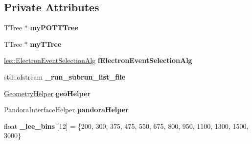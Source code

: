 \subsection*{Private Attributes}
\begin{DoxyCompactItemize}
\item 
\hypertarget{classlee_1_1ElectronNeutrinoFilter_a71f4be7e318ce49ff07a948e17afe40d}{T\-Tree $\ast$ {\bfseries my\-P\-O\-T\-T\-Tree}}\label{classlee_1_1ElectronNeutrinoFilter_a71f4be7e318ce49ff07a948e17afe40d}

\item 
\hypertarget{classlee_1_1ElectronNeutrinoFilter_a0cd8d0a8b3466ad728bd8b520c2fd392}{T\-Tree $\ast$ {\bfseries my\-T\-Tree}}\label{classlee_1_1ElectronNeutrinoFilter_a0cd8d0a8b3466ad728bd8b520c2fd392}

\item 
\hypertarget{classlee_1_1ElectronNeutrinoFilter_a218cb05b2710a8cfaa9021cc7850bb28}{\hyperlink{classlee_1_1ElectronEventSelectionAlg}{lee\-::\-Electron\-Event\-Selection\-Alg} {\bfseries f\-Electron\-Event\-Selection\-Alg}}\label{classlee_1_1ElectronNeutrinoFilter_a218cb05b2710a8cfaa9021cc7850bb28}

\item 
\hypertarget{classlee_1_1ElectronNeutrinoFilter_ac9531a2782934676b4a5c5562da3139c}{std\-::ofstream {\bfseries \-\_\-run\-\_\-subrun\-\_\-list\-\_\-file}}\label{classlee_1_1ElectronNeutrinoFilter_ac9531a2782934676b4a5c5562da3139c}

\item 
\hypertarget{classlee_1_1ElectronNeutrinoFilter_ae709489ed7e674f1e54d7e756058bacf}{\hyperlink{classlee_1_1GeometryHelper}{Geometry\-Helper} {\bfseries geo\-Helper}}\label{classlee_1_1ElectronNeutrinoFilter_ae709489ed7e674f1e54d7e756058bacf}

\item 
\hypertarget{classlee_1_1ElectronNeutrinoFilter_affbf7de91f50382bd10ac94512a6bb54}{\hyperlink{classlee_1_1PandoraInterfaceHelper}{Pandora\-Interface\-Helper} {\bfseries pandora\-Helper}}\label{classlee_1_1ElectronNeutrinoFilter_affbf7de91f50382bd10ac94512a6bb54}

\item 
\hypertarget{classlee_1_1ElectronNeutrinoFilter_afe0c623e95ee20604061b1b9af89fcae}{float {\bfseries \-\_\-lee\-\_\-bins} \mbox{[}12\mbox{]} = \{200, 300, 375, 475, 550, 675, 800, 950, 1100, 1300, 1500, 3000\}}\label{classlee_1_1ElectronNeutrinoFilter_afe0c623e95ee20604061b1b9af89fcae}


\end{DoxyCompactItemize}
